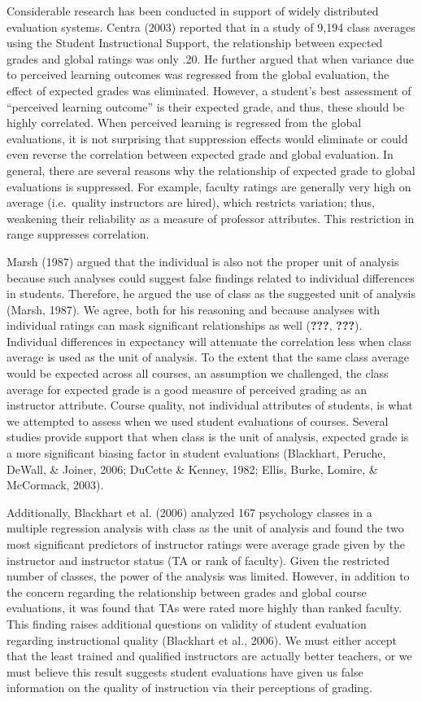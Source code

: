 \documentclass[man]{apa6}
\theoremstyle{definition}
\theoremstyle{definition}
\theoremstyle{definition}
\theoremstyle{remark}
\begin{document}
Considerable research has been conducted in support of widely
distributed evaluation systems. Centra (2003) reported that in a study
of 9,194 class averages using the Student Instructional Support, the
relationship between expected grades and global ratings was only .20. He
further argued that when variance due to perceived learning outcomes was
regressed from the global evaluation, the effect of expected grades was
eliminated. However, a student's best assessment of \enquote{perceived
learning outcome} is their expected grade, and thus, these should be
highly correlated. When perceived learning is regressed from the global
evaluations, it is not surprising that suppression effects would
eliminate or could even reverse the correlation between expected grade
and global evaluation. In general, there are several reasons why the
relationship of expected grade to global evaluations is suppressed. For
example, faculty ratings are generally very high on average
(i.e.~quality instructors are hired), which restricts variation; thus,
weakening their reliability as a measure of professor attributes. This
restriction in range suppresses correlation.

Marsh (1987) argued that the individual is also not the proper unit of
analysis because such analyses could suggest false findings related to
individual differences in students. Therefore, he argued the use of
class as the suggested unit of analysis (Marsh, 1987). We agree, both
for his reasoning and because analyses with individual ratings can mask
significant relationships as well ({\textbf{???}}, {\textbf{???}}).
Individual differences in expectancy will attenuate the correlation less
when class average is used as the unit of analysis. To the extent that
the same class average would be expected across all courses, an
assumption we challenged, the class average for expected grade is a good
measure of perceived grading as an instructor attribute. Course quality,
not individual attributes of students, is what we attempted to assess
when we used student evaluations of courses. Several studies provide
support that when class is the unit of analysis, expected grade is a
more significant biasing factor in student evaluations (Blackhart,
Peruche, DeWall, \& Joiner, 2006; DuCette \& Kenney, 1982; Ellis, Burke,
Lomire, \& McCormack, 2003).

Additionally, Blackhart et al. (2006) analyzed 167 psychology classes in
a multiple regression analysis with class as the unit of analysis and
found the two most significant predictors of instructor ratings were
average grade given by the instructor and instructor status (TA or rank
of faculty). Given the restricted number of classes, the power of the
analysis was limited. However, in addition to the concern regarding the
relationship between grades and global course evaluations, it was found
that TAs were rated more highly than ranked faculty. This finding raises
additional questions on validity of student evaluation regarding
instructional quality (Blackhart et al., 2006). We must either accept
that the least trained and qualified instructors are actually better
teachers, or we must believe this result suggests student evaluations
have given us false information on the quality of instruction via their
perceptions of grading.
\end{document}
